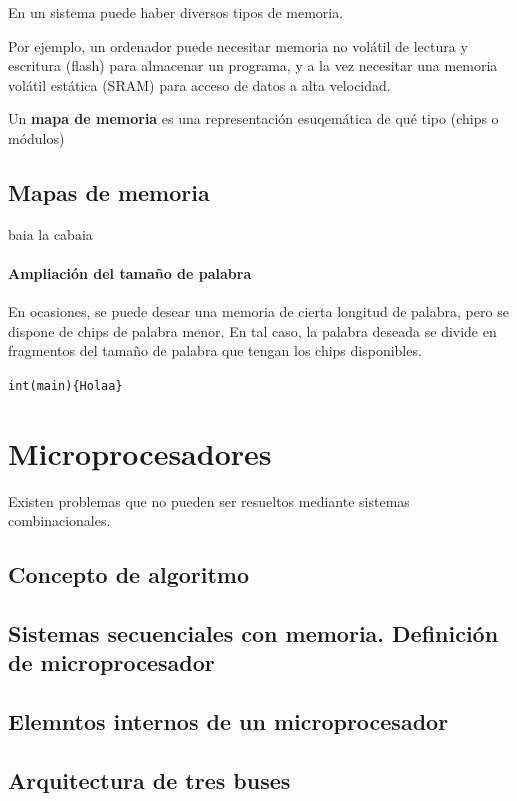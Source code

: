\documentclass[a4paper]{book}
\begin{document}
En un sistema puede haber diversos tipos de memoria.

Por ejemplo, un ordenador puede necesitar memoria no volátil de lectura y escritura (flash) para almacenar un programa, y a la vez necesitar una memoria volátil estática (SRAM) para acceso de datos a alta velocidad.

Un \textbf{mapa de memoria} es una representación esuqemática de qué tipo (chips o módulos)

\section{Mapas de memoria}

baia la cabaia

\subsubsection{Ampliación del tamaño de palabra}

En ocasiones, se puede desear una memoria de cierta longitud de palabra, pero se dispone de chips de palabra menor. En tal caso, la palabra deseada se divide en fragmentos del tamaño de palabra que tengan los chips disponibles.

\verb|int(main){Holaa}|

\chapter{Microprocesadores}

Existen problemas que no pueden ser resueltos mediante sistemas combinacionales.
\section{Concepto de algoritmo}

\section{Sistemas secuenciales con memoria. Definición de microprocesador}

\section{Elemntos internos de un microprocesador}

\section{Arquitectura de tres buses}
\end{document}
